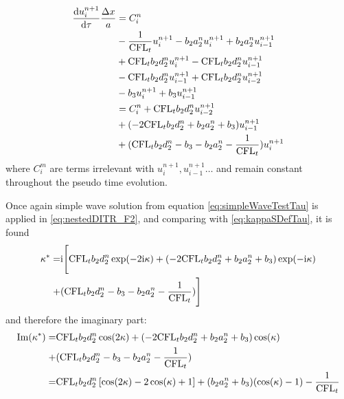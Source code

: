 \documentclass[preprint,12pt]{elsarticle}
\begin{document}
\begin{equation}
    \begin{aligned}
        \frac{\dd u_i^{n+1}}{\dd \tau}\frac{\mathrm\Delta x}{a} & =
        C_i^n                                              \\
                                                       &
        -  \frac{1}{\text{CFL}_t} u_i^{n+1}
        -  b_2a_2^n u_i^{n+1}
        +  b_2a_2^n u_{i-1}^{n+1}
        \\
                                                       &
        + \text{CFL}_t b_2 d_2^n u_i^{n+1}
        - \text{CFL}_t b_2 d_2^n u_{i-1}^{n+1}
        \\
                                                       &
        - \text{CFL}_t b_2 d_2^n u_{i-1}^{n+1}
        + \text{CFL}_t b_2 d_2^n u_{i-2}^{n+1}
        \\
                                                       &
        -b_3 u_i^{n+1}
        +b_3 u_{i-1}^{n+1}
        \\
                                                       &
        =C_i^n  +  \text{CFL}_t b_2 d_2^n u_{i-2}^{n+1}
        \\
                                                       & +
        (-2\text{CFL}_t b_2 d_2^n + b_2a_2^n + b_3)u_{i-1}^{n+1}
        \\
                                                       & +
        (\text{CFL}_t b_2 d_2^n - b_3 - b_2a_2^n -  \frac{1}{\text{CFL}_t})u_i^{n+1}
        \label{eq:nestedDITR_F2}
    \end{aligned}
\end{equation}
where $C_i^m$ are terms irrelevant with $u_i^{n+1}, u_{i-1}^{n+1}\dots$
and remain constant throughout the pseudo time evolution.

Once again simple wave solution from equation \eqref{eq:simpleWaveTestTau}
is applied in \eqref{eq:nestedDITR_F2}, and comparing with
\eqref{eq:kappaSDefTau}, it is found
\begin{equation}
    \begin{aligned}
        \kappa^* = & \mathrm{i}
        \Biggl[
            \text{CFL}_t b_2 d_2^n \exp(-2\mathrm{i}\kappa)
            +
            (-2\text{CFL}_t b_2 d_2^n + b_2a_2^n + b_3)\exp(-\mathrm{i}\kappa)
        \\ + &
            (\text{CFL}_t b_2 d_2^n - b_3 - b_2a_2^n -  \frac{1}{\text{CFL}_t})
            \Biggr]
    \end{aligned}
\end{equation}
and therefore the imaginary part:
\begin{equation}
    \begin{aligned}
        \mathrm{Im}(\kappa^*) = &
        \text{CFL}_t b_2 d_2^n \cos(2\kappa)
        +
        (-2\text{CFL}_t b_2 d_2^n + b_2a_2^n + b_3)\cos(\kappa)
        \\ + &
        (\text{CFL}_t b_2 d_2^n - b_3 - b_2a_2^n -  \frac{1}{\text{CFL}_t})
        \\
        =                 &
        \text{CFL}_t b_2 d_2^n \left[\cos(2\kappa) -2\cos(\kappa) + 1\right]
        + (b_2a_2^n + b_3) (\cos(\kappa) - 1) - \frac{1}{\text{CFL}_t}
    \end{aligned}
    \label{eq:imagKsTauDITR}
\end{equation}
\end{document}
